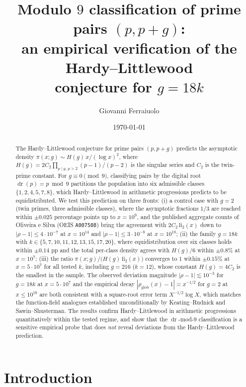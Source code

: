 \documentclass[11pt]{amsart}
\title{Modulo $9$ classification of prime pairs $(p,p+g)$:\\
an empirical verification of the Hardy--Littlewood\\
conjecture for $g=18k$}
\author{Giovanni Ferraiuolo}
\date{\today}
\theoremstyle{plain}
\theoremstyle{definition}
\theoremstyle{remark}
\DeclareMathOperator{\dr}{dr}
\begin{document}
\begin{abstract}
The Hardy--Littlewood conjecture for prime pairs $(p,p+g)$ predicts the
asymptotic density $\pi(x;g) \sim H(g)\,x/(\log x)^2$, where
$H(g) = 2C_2 \prod_{p \mid g,\,p>2}(p-1)/(p-2)$ is the singular series
and $C_2$ is the twin-prime constant. For $g \equiv 0 \pmod 9$,
classifying pairs by the digital root $\dr(p)=p \bmod 9$ partitions
the population into six admissible classes $\{1,2,4,5,7,8\}$, which
Hardy--Littlewood in arithmetic progressions predicts to be
equidistributed. We test this prediction on three fronts: (i) a control
case with $g=2$ (twin primes, three admissible classes), where the
asymptotic fractions $1/3$ are reached within $\pm 0.025$ percentage
points up to $x = 10^9$, and the published aggregate counts of
Oliveira e Silva (OEIS \texttt{A007508}) bring the agreement with
$2C_2\,\mathrm{li}_2(x)$ down to $|\rho-1| \le 4 \cdot 10^{-7}$ at
$x = 10^{14}$ and $|\rho - 1| \le 3 \cdot 10^{-8}$ at $x = 10^{18}$;
(ii) the family $g = 18k$ with $k\in\{5,7,10,11,12,13,15,17,20\}$,
where equidistribution over six classes holds within $\pm 0.14$ pp
and the total per-class density agrees with $H(g)/6$ within
$\pm 0.8\%$ at $x = 10^7$; (iii) the ratio
$\pi(x;g)/\bigl(H(g)\,\mathrm{li}_2(x)\bigr)$ converges to $1$ within
$\pm 0.15\%$ at $x = 5\cdot 10^7$ for all tested $k$, including
$g=216$ ($k=12$), whose constant $H(g) = 4 C_2$ is the smallest in the
sample. The observed deviation magnitude $|\rho - 1| \lesssim 10^{-3}$
for $g = 18k$ at $x = 5\cdot 10^7$ and the empirical decay
$|\rho_{\mathrm{glob}}(x) - 1| \asymp x^{-1/2}$ for $g = 2$ at
$x \le 10^{18}$ are both consistent with a square-root error term
$X^{-1/2}\log X$, which matches the function-field analogues
established unconditionally by Keating--Rudnick and Sawin--Shusterman.
The results confirm Hardy--Littlewood in arithmetic progressions
quantitatively within the tested regime, and show that the
$\dr$-mod-$9$ classification is a sensitive empirical probe that does
\emph{not} reveal deviations from the Hardy--Littlewood prediction.
\end{abstract}


\maketitle

\section{Introduction}\label{sec:intro}
\end{document}
